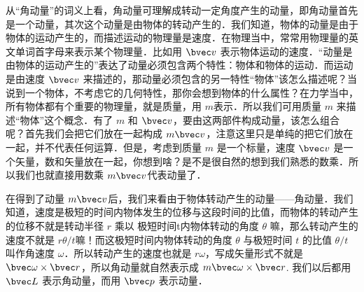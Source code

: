 
\begin{issues}
\issueTODO
\end{issues}

从“角动量”的词义上看，角动量可理解成转动一定角度产生的动量，即角动量首先是一个动量，其次这个动量是由物体的转动产生的．我们知道，物体的动量是由于物体的运动产生的，而描述运动的物理量是速度．在物理当中，常常用物理量的英文单词首字母来表示某个物理量．比如用 $\bvec v$ 表示物体运动的速度．“动量是由物体的运动产生的”表达了动量必须包含两个特性：物体和物体的运动．而运动是由速度 $\bvec v$ 来描述的，那动量必须包含的另一特性“物体”该怎么描述呢？当说到一个物体，不考虑它的几何特性，那你会想到物体的什么属性？在力学当中，所有物体都有个重要的物理量，就是质量，用 $m$表示．所以我们可用质量 $m$ 来描述“物体”这个概念．有了 $m$ 和 $\bvec v$，要由这两部件构成动量，该怎么组合呢？首先我们会把它们放在一起构成 $m\bvec v$，注意这里只是单纯的把它们放在一起，并不代表任何运算．但是，考虑到质量 $m$ 是一个标量，速度 $\bvec v$ 是一个矢量，数和矢量放在一起，你想到啥？是不是很自然的想到我们熟悉的数乘．所以我们也就直接用数乘 $m\bvec v$代表动量了．

在得到了动量 $m\bvec v$后，我们来看由于物体转动产生的动量——角动量．我们知道，速度是极短的时间内物体发生的位移与这段时间的比值，而物体的转动产生的位移不就是转动半径 $r$ 乘以 极短时间t内物体转动的角度 $\theta$ 嘛，那么转动产生的速度不就是 $r\theta/t$嘛！而这极短时间内物体转动的角度 $\theta$ 与极短时间 $t$ 的比值 $\theta/t$ 叫作角速度 $\omega$．所以转动产生的速度也就是 $r\omega$，写成矢量形式不就是 $\bvec \omega\times \bvec r$，所以角动量就自然表示成 $m\bvec \omega\times \bvec r$. 我们以后都用 $\bvec L$ 表示角动量，而用 $\bvec p$ 表示动量．
